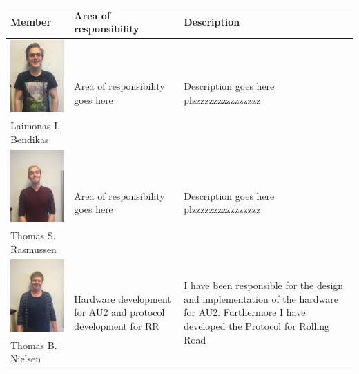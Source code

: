 \newpage
\begin{tabular}[c]{|p{3cm}| p{5cm} | p{6cm}|}
	\hline
	\textbf{Member} & \textbf{Area of responsibility} & \textbf{Description}\\\hline
	
	\phantom{Test}
	\includegraphics[width=3cm]{Introduction/TeamPictures/Laimonas} & \multirow{2}{5cm}{Area of responsibility goes here} & \multirow{2}{6cm}{Description goes here plzzzzzzzzzzzzzzzz} \\
	Laimonas I. \newline Bendikas & & \\ \hline
		
	\phantom{Test}
	\includegraphics[width=3cm]{Introduction/TeamPictures/ThomasR} & \multirow{2}{5cm}{Area of responsibility goes here} & \multirow{2}{6cm}{Description goes here plzzzzzzzzzzzzzzzz} \\
	Thomas S. \newline Rasmussen & & \\ \hline
		
	\phantom{Test}
	\includegraphics[width=3cm]{Introduction/TeamPictures/ThomasN} & \multirow{2}{5cm}{Hardware development for AU2 and protocol development for RR} & \multirow{2}{6cm}{I have been responsible for the design and implementation of the hardware for AU2. Furthermore I have developed the Protocol for Rolling Road} \\
	Thomas B. \newline Nielsen & & \\ \hline
\end{tabular}